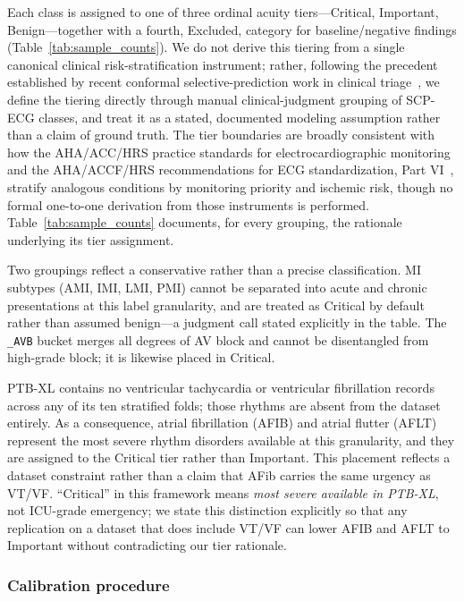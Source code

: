 Each class is assigned to one of three ordinal acuity tiers---Critical, Important,
Benign---together with a fourth, Excluded, category for baseline/negative findings
(Table~\ref{tab:sample_counts}).
We do not derive this tiering from a single canonical clinical risk-stratification
instrument; rather, following the precedent established by recent conformal
selective-prediction work in clinical triage~\cite{kwon2026}, we define the tiering
directly through manual clinical-judgment grouping of SCP-ECG classes, and treat it
as a stated, documented modeling assumption rather than a claim of ground truth.
The tier boundaries are broadly consistent with how the AHA/ACC/HRS practice
standards for electrocardiographic monitoring~\cite{sandau2017} and the AHA/ACCF/HRS
recommendations for ECG standardization, Part VI~\cite{wagner2009}, stratify
analogous conditions by monitoring priority and ischemic risk, though no formal
one-to-one derivation from those instruments is performed.
Table~\ref{tab:sample_counts} documents, for every grouping, the rationale
underlying its tier assignment.

Two groupings reflect a conservative rather than a precise classification.
MI subtypes (AMI, IMI, LMI, PMI) cannot be separated into acute and chronic
presentations at this label granularity, and are treated as Critical by default
rather than assumed benign---a judgment call stated explicitly in the table.
The \texttt{\_AVB} bucket merges all degrees of AV block and cannot be disentangled
from high-grade block; it is likewise placed in Critical.

PTB-XL contains no ventricular tachycardia or ventricular fibrillation records
across any of its ten stratified folds; those rhythms are absent from the dataset
entirely.
As a consequence, atrial fibrillation (AFIB) and atrial flutter (AFLT) represent
the most severe rhythm disorders available at this granularity, and they are assigned
to the Critical tier rather than Important.
This placement reflects a dataset constraint rather than a claim that AFib carries
the same urgency as VT/VF.
``Critical'' in this framework means \emph{most severe available in PTB-XL}, not
ICU-grade emergency; we state this distinction explicitly so that any replication on
a dataset that does include VT/VF can lower AFIB and AFLT to Important without
contradicting our tier rationale.

\subsubsection{Calibration procedure}
\label{sec:calibration}

